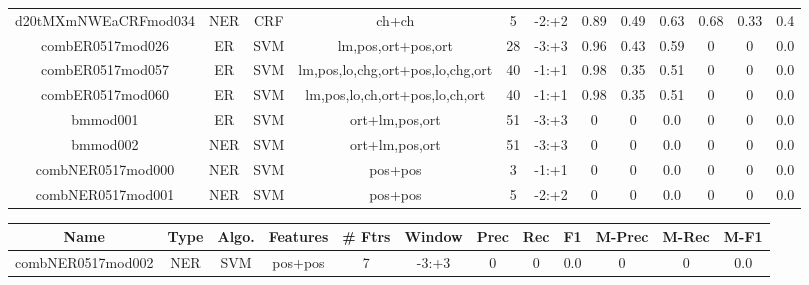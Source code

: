 \documentclass[a4paper]{article}
\begin{document}
\begin{landscape}
\begin{center}
\begin{tabular}{ |c|c|c|c|c|c|c|c|c|c|c|c|}
 
 	
 	\small{ d20tMXmNWEaCRFmod034 } & NER & CRF & ch+ch  &  5 &  -2:+2  &  0.89 & 0.49 & 0.63  &  0.68 & 0.33 & 0.4 \\
 	

 
 	
 	\small{ combER0517mod026 } & ER & SVM & lm,pos,ort+pos,ort  &  28 &  -3:+3  &  0.96 & 0.43 & 0.59  &  0 & 0 & 0.0 \\
 	

 
 	
 	\small{ combER0517mod057 } & ER & SVM & lm,pos,lo,chg,ort+pos,lo,chg,ort  &  40 &  -1:+1  &  0.98 & 0.35 & 0.51  &  0 & 0 & 0.0 \\
 	

 
 	
 	\small{ combER0517mod060 } & ER & SVM & lm,pos,lo,ch,ort+pos,lo,ch,ort  &  40 &  -1:+1  &  0.98 & 0.35 & 0.51  &  0 & 0 & 0.0 \\
 	

 
 	
 	\small{ bmmod001 } & ER & SVM & ort+lm,pos,ort  &  51 &  -3:+3  &  0 & 0 & 0.0  &  0 & 0 & 0.0 \\
 	

 
 	
 	\small{ bmmod002 } & NER & SVM & ort+lm,pos,ort  &  51 &  -3:+3  &  0 & 0 & 0.0  &  0 & 0 & 0.0 \\
 	

 
 	
 	\small{ combNER0517mod000 } & NER & SVM & pos+pos  &  3 &  -1:+1  &  0 & 0 & 0.0  &  0 & 0 & 0.0 \\
 	

 
 	
 	\small{ combNER0517mod001 } & NER & SVM & pos+pos  &  5 &  -2:+2  &  0 & 0 & 0.0  &  0 & 0 & 0.0 \\
 	
 \hline
\end{tabular}
\end{center}




\begin{center}
\begin{tabular}{ |c|c|c|c|c|c|c|c|c|c|c|c|} 
 \hline
 	Name & Type & Algo. & Features & \# Ftrs & Window & Prec & Rec & F1 & M-Prec & M-Rec & M-F1\\
 \hline

 	

 
 	
 	\small{ combNER0517mod002 } & NER & SVM & pos+pos  &  7 &  -3:+3  &  0 & 0 & 0.0  &  0 & 0 & 0.0 \\
 	


\end{tabular}
\end{center}
\end{landscape}
\end{document}
